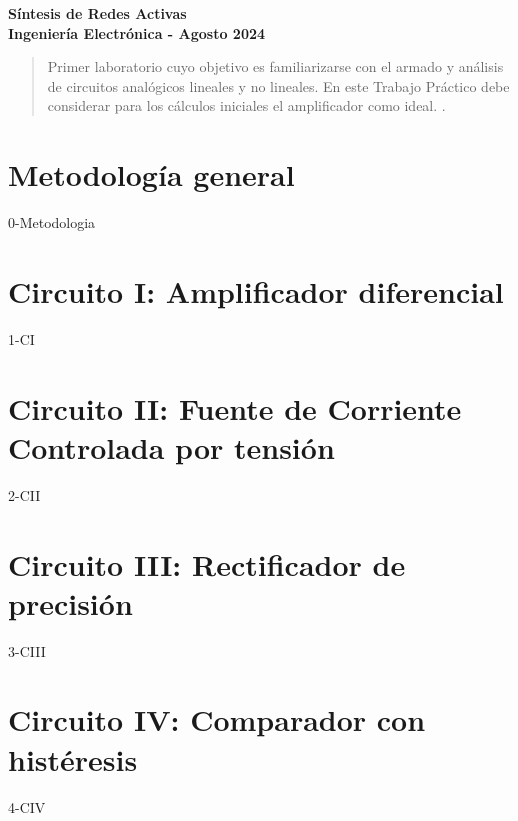 \documentclass{article}
\author{
\large
\textsc{\textbf{Profesor Titular:} Dr. Ing. Pablo Ferreyra}\\
\textsc{\textbf{Profesor Adjunto:} Ing. César Reale} \\
\textsc{\textbf{Profesor Ayudate:} TBD} \\
\textsc{\textbf{Ayudante alumno:} TBD} \\
\normalsize Facultad de Ciencias Exactas Físicas y Naturales \\ Universidad Nacional de Córdoba  %
\vspace{-5mm}
}
\begin{document}
\maketitle

\begin{center}

\textbf{Síntesis de Redes Activas}\\

\textbf{Ingeniería Electrónica - Agosto 2024}\\

\end{center}

\thispagestyle{fancy}


 \begin{abstract}

 \noindent Primer laboratorio cuyo objetivo es familiarizarse con el armado y análisis de circuitos analógicos lineales y no lineales. En este
Trabajo Práctico debe considerar para los cálculos iniciales el amplificador como ideal. .

 \end{abstract}

\section{Metodología general}
{0-Metodologia}

\newpage{}
\section{Circuito I: Amplificador diferencial}
{1-CI}
\newpage
\section{Circuito II: Fuente de Corriente Controlada por tensión}
{2-CII}

\newpage
\section{Circuito III: Rectificador de precisión}
{3-CIII}

\newpage{}
\section{Circuito IV: Comparador con histéresis}
{4-CIV}
\end{document}

